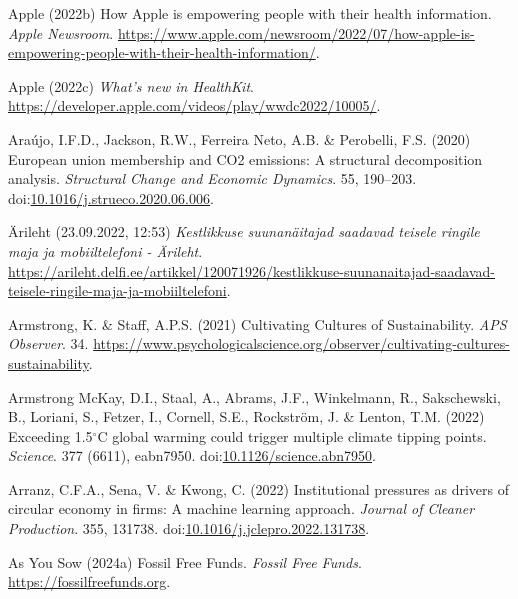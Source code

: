 \documentclass[
  letterpaper,
  DIV=11,
  numbers=noendperiod]{scrartcl}
\newlength{\cslhangindent}
\newenvironment{CSLReferences}[2] %
 {\begin{list}{}{%
  \setlength{\itemindent}{0pt}
  \setlength{\leftmargin}{0pt}
  \setlength{\parsep}{0pt}
  \ifodd #1
   \setlength{\leftmargin}{\cslhangindent}
   \setlength{\itemindent}{-1\cslhangindent}
  \fi
  \setlength{\itemsep}{#2\baselineskip}}}
 {\end{list}}
\begin{document}
\begin{CSLReferences}{0}{1}
Apple (2022b) How {Apple} is empowering people with their health
information. \emph{Apple Newsroom}.
\url{https://www.apple.com/newsroom/2022/07/how-apple-is-empowering-people-with-their-health-information/}.

Apple (2022c) \emph{What's new in {HealthKit}}.
\url{https://developer.apple.com/videos/play/wwdc2022/10005/}.

Araújo, I.F.D., Jackson, R.W., Ferreira Neto, A.B. \& Perobelli, F.S.
(2020) European union membership and {CO2} emissions: {A} structural
decomposition analysis. \emph{Structural Change and Economic Dynamics}.
55, 190--203.
doi:\href{https://doi.org/10.1016/j.strueco.2020.06.006}{10.1016/j.strueco.2020.06.006}.

Ärileht (23.09.2022, 12:53) \emph{Kestlikkuse suunan{ä}itajad saadavad
teisele ringile maja ja mobiiltelefoni - {{Ä}rileht}}.
\url{https://arileht.delfi.ee/artikkel/120071926/kestlikkuse-suunanaitajad-saadavad-teisele-ringile-maja-ja-mobiiltelefoni}.

Armstrong, K. \& Staff, A.P.S. (2021) Cultivating {Cultures} of
{Sustainability}. \emph{APS Observer}. 34.
\url{https://www.psychologicalscience.org/observer/cultivating-cultures-sustainability}.

Armstrong McKay, D.I., Staal, A., Abrams, J.F., Winkelmann, R.,
Sakschewski, B., Loriani, S., Fetzer, I., Cornell, S.E., Rockström, J.
\& Lenton, T.M. (2022) Exceeding 1.5{\(^\circ\)}{C} global warming could
trigger multiple climate tipping points. \emph{Science}. 377 (6611),
eabn7950.
doi:\href{https://doi.org/10.1126/science.abn7950}{10.1126/science.abn7950}.

Arranz, C.F.A., Sena, V. \& Kwong, C. (2022) Institutional pressures as
drivers of circular economy in firms: {A} machine learning approach.
\emph{Journal of Cleaner Production}. 355, 131738.
doi:\href{https://doi.org/10.1016/j.jclepro.2022.131738}{10.1016/j.jclepro.2022.131738}.

As You Sow (2024a) Fossil {Free Funds}. \emph{Fossil Free Funds}.
\url{https://fossilfreefunds.org}.


\end{CSLReferences}
\end{document}

